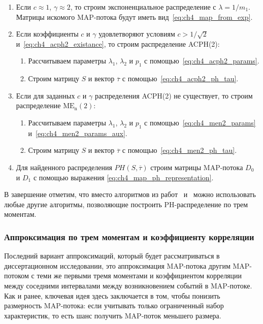 \begin{enumerate}
    \item Если $c \approx 1$, $\gamma \approx 2$, то строим экспоненциальное распределение с $\lambda = 1/m_1$. Матрицы искомого MAP-потока будут иметь вид~\eqref{eq:ch4_map_from_exp}.
    \item Если коэффициенты $c$ и $\gamma$ удовлетворяют условиям $c > 1/\sqrt{2}$ и~\eqref{eq:ch4_acph2_existance}, то строим распределение ACPH(2):
    \begin{enumerate}
        \item Рассчитываем параметры $\lambda_1$, $\lambda_2$ и $p_1$ с помощью~\eqref{eq:ch4_acph2_params}.
        \item Строим матрицу $S$ и вектор $\overline{\tau}$ с помощью~\eqref{eq:ch4_acph2_ph_tau}.
    \end{enumerate}
    \item Если для заданных $c$ и $\gamma$ распределения ACPH(2) не существует, то строим распределение $\text{ME}_\text{n}(2)$:
    \begin{enumerate}
        \item Рассчитываем параметры $\lambda_1$, $\lambda_2$ и $p_1$ с помощью~\eqref{eq:ch4_men2_params} и~\eqref{eq:ch4_men2_params_aux}.
        \item Строим матрицу $S$ и вектор $\overline{\tau}$ с помощью~\eqref{eq:ch4_men2_ph_tau}.
    \end{enumerate}
    \item Для найденного распределения $PH(S, \overline{\tau})$ строим матрицы MAP-потока $D_0$ и $D_1$ с помощью выражения \eqref{eq:ch4_map_ph_representation}.
\end{enumerate}

В завершение отметим, что вместо алгоритмов из работ~\cite{Telek2003} и~\cite{Johnson1989} можно использовать любые другие алгоритмы, позволяющие построить PH-распределение по трем моментам.



\subsubsection{Аппроксимация по трем моментам и коэффициенту корреляции}\label{sec:ch4_approx_m3_lag1}

Последний вариант аппроксимаций, который будет рассматриваться в диссертационном исследовании, это аппроксимация MAP-потока другим MAP-потоком с теми же первыми тремя моментами и коэффициентом корреляции между соседними интервалами между возникновением событий в MAP-потоке. Как и ранее, ключевая идея здесь заключается в том, чтобы понизить размерность MAP-потока: если учитывать только ограниченный набор характеристик, то есть шанс получить MAP-поток меньшего размера.

